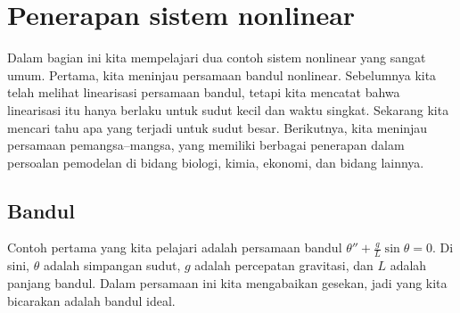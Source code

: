 

\sectionnewpage
\section{Penerapan sistem nonlinear}
\label{nlinapps:section}



Dalam bagian ini kita mempelajari dua contoh sistem nonlinear yang sangat
umum. Pertama, kita meninjau persamaan bandul nonlinear. Sebelumnya kita telah
melihat linearisasi persamaan bandul, tetapi kita mencatat bahwa linearisasi itu
hanya berlaku untuk sudut kecil dan waktu singkat. Sekarang kita mencari tahu
apa yang terjadi untuk sudut besar. Berikutnya, kita meninjau persamaan
pemangsa--mangsa, yang memiliki berbagai penerapan dalam persoalan pemodelan
di bidang biologi, kimia, ekonomi, dan bidang lainnya.

\subsection{Bandul}

Contoh pertama yang kita pelajari adalah persamaan bandul
$\theta''+\frac{g}{L} \sin \theta = 0$. Di sini, $\theta$ adalah simpangan
sudut, $g$ adalah percepatan gravitasi, dan $L$ adalah panjang bandul. Dalam
persamaan ini kita mengabaikan gesekan, jadi yang kita bicarakan adalah bandul
ideal.

